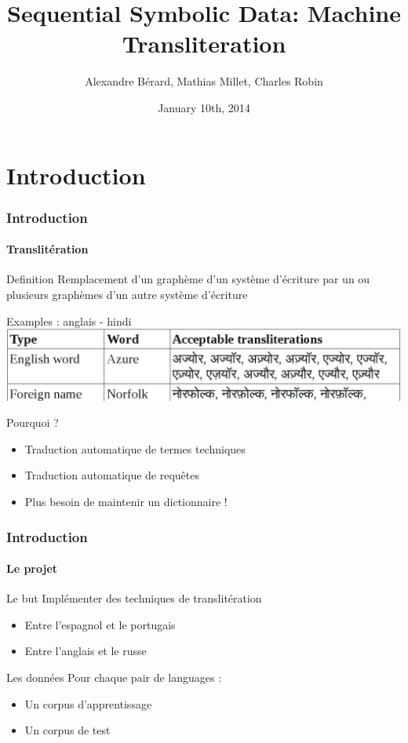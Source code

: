 \documentclass{beamer}
\title[Machine Transliteration]{Sequential Symbolic Data: Machine Transliteration}
\author[A.~Bérard, M.~Millet, C.~Robin]{Alexandre Bérard, Mathias Millet, Charles Robin}
\date{January 10th, 2014}
\begin{document}
\begin{frame}
\titlepage
\end{frame}

\section{Introduction}   
 
\begin{frame}
    \frametitle{Introduction}
	\framesubtitle{Translitération}
	\begin{block}{Definition}
	    Remplacement d'un graphème d'un système d'écriture par un ou plusieurs graphèmes d'un autre système d'écriture
    \end{block}	    
    
	\begin{exampleblock}{Examples : anglais - hindi}
	\includegraphics[scale=0.2]{en-in-example}
    \end{exampleblock}
    
	\begin{block}{Pourquoi ?}
	\begin{itemize}
		\item Traduction automatique de termes techniques
		\item Traduction automatique de requ\^etes
		\item Plus besoin de maintenir un dictionnaire !
	\end{itemize}
	\end{block}	    
    
    
\end{frame}

\begin{frame}
\frametitle{Introduction}
\framesubtitle{Le projet}

	\begin{block}{Le but}
		Implémenter des techniques de translitération 
		\begin{itemize}
		\item Entre l'espagnol et le portugais
		\item Entre l'anglais et le russe
		\end{itemize}
	\end{block}

	\begin{block}{Les données}
	Pour chaque pair de languages :		
		\begin{itemize}
		\item Un corpus d'apprentissage
		\item Un corpus de test
		\end{itemize}		
	\end{block}

\end{frame}
\end{document}
